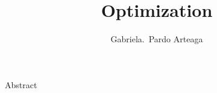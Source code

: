 \documentclass{tudelft-report}
\begin{document}
\frontmatter

\title[Sailing Path]{Optimization}
\author{Gabriela.\ Pardo Arteaga}





\tableofcontents
{} {Abstract}

\mainmatter



%

%


%
\end{document}
